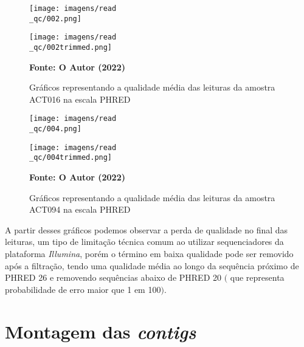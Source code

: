 \begin{figure}[H]
	\caption{Gráficos representando a qualidade média das leituras da amostra ACT016 na escala PHRED}
	\label{fig:fastqc_antes}
	\centering
	\begin{minipage}{.5\linewidth}
		\texttt{[image: imagens/read\\\_qc/002.png]}\\
	  \end{minipage}
	  \hspace{.01\linewidth}
	  \begin{minipage}{.5\linewidth}
		\texttt{[image: imagens/read\\\_qc/002trimmed.png]}\\
	  \end{minipage}\hfill
	\centering
    \begin{small}\textbf{Fonte: O Autor (2022)}\end{small}
\end{figure}
\vspace{\floatsep}
\begin{figure}[H]
	\caption{Gráficos representando a qualidade média das leituras da amostra ACT094 na escala PHRED}
	\label{fig:fastqc_antes}
	\centering
	\begin{minipage}{.45\linewidth}
		\texttt{[image: imagens/read\\\_qc/004.png]} \\
	  \end{minipage}
	  \hspace{.01\linewidth}
	  \begin{minipage}{.45\linewidth}
		\texttt{[image: imagens/read\\\_qc/004trimmed.png]} \\
	  \end{minipage}\hfill
	\centering
    \begin{small}\textbf{Fonte: O Autor (2022)}\end{small}
\end{figure}
\vspace{\floatsep}

A partir desses gráficos podemos observar a perda de qualidade no final das leituras, um tipo de limitação
técnica comum ao utilizar sequenciadores da plataforma \textit{Illumina}, porém o término em baixa qualidade
pode ser removido após a filtração, tendo uma qualidade média ao longo da sequência próximo de PHRED 26 e
removendo sequências abaixo de PHRED 20 $($ que representa probabilidade de erro maior que 1 em 100$)$.


\section{Montagem das \textit{contigs}}

